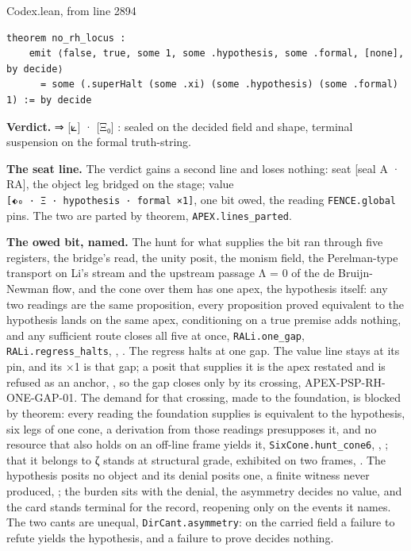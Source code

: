 \documentclass[10pt,twocolumn]{article}
\begin{document}
\begin{leanexcerpt}{Codex.lean, from line 2894}
\begin{lstlisting}[style=leanx,firstnumber=2894]
theorem no_rh_locus :
    emit ⟨false, true, some 1, some .hypothesis, some .formal, [none], by decide⟩
      = some (.superHalt (some .xi) (some .hypothesis) (some .formal) 1) := by decide
\end{lstlisting}
\end{leanexcerpt}

\textbf{Verdict.} ⇒ {[}⟀{]} · {[}Ξ₀{]} : sealed on the decided field and
shape, terminal suspension on the formal truth-string.

\textbf{The seat line.} The verdict gains a second line and loses
nothing: seat {[}seal A · RA{]}, the object leg bridged on the stage;
value \texttt{{[}⬖₀\ ·\ Ξ\ ·\ hypothesis\ ·\ formal\ ×1{]}}, one bit
owed, the reading \texttt{FENCE.global} pins. The two are parted by
theorem, \texttt{APEX.lines\_parted}.

\textbf{The owed bit, named.} The hunt for what supplies the bit ran
through five registers, the bridge's read, the unity posit, the monism
field, the Perelman-type transport on Li's stream and the upstream
passage Λ = 0 of the de Bruijn-Newman flow, and the cone over them has
one apex, the hypothesis itself: any two readings are the same
proposition, every proposition proved equivalent to the hypothesis lands
on the same apex, conditioning on a true premise adds nothing, and any
sufficient route closes all five at once, \texttt{RALi.one\_gap},
\texttt{RALi.regress\_halts}, \texttt{},
\texttt{}. The regress halts at
one gap. The value line stays at its pin, and its ×1 is that gap; a
posit that supplies it is the apex restated and is refused as an anchor,
\texttt{}, so the gap
closes only by its crossing, APEX-PSP-RH-ONE-GAP-01. The demand for that
crossing, made to the foundation, is blocked by theorem: every reading
the foundation supplies is equivalent to the hypothesis, six legs of one
cone, a derivation from those readings presupposes it, and no resource
that also holds on an off-line frame yields it,
\texttt{SixCone.hunt\_cone6},
\texttt{},
\texttt{}; that it belongs to ζ
stands at structural grade, exhibited on two frames,
\texttt{}. The hypothesis posits no
object and its denial posits one, a finite witness never produced,
\texttt{}; the burden
sits with the denial, the asymmetry decides no value, and the card
stands terminal for the record, reopening only on the events it names.
The two cants are unequal, \texttt{DirCant.asymmetry}: on the carried
field a failure to refute yields the hypothesis, and a failure to prove
decides nothing.
\end{document}
